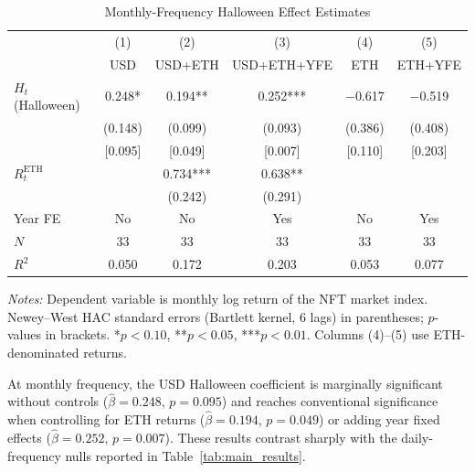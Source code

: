 \documentclass[12pt,a4paper]{article}
\begin{document}
\begin{table}[htbp]
\centering
\begin{threeparttable}
\caption{Monthly-Frequency Halloween Effect Estimates}
\label{tab:monthly}

\begin{tabular*}{\textwidth}{@{\extracolsep{\fill}} lccccc}
\toprule
& (1) & (2) & (3) & (4) & (5) \\
& USD & USD+ETH & USD+ETH+YFE & ETH & ETH+YFE \\
\midrule
$H_t$ (Halloween)  & 0.248*   & 0.194**  & 0.252*** & $-$0.617 & $-$0.519 \\
                   & (0.148)  & (0.099)  & (0.093)  & (0.386)  & (0.408) \\
                   & [0.095]  & [0.049]  & [0.007]  & [0.110]  & [0.203] \\
\addlinespace
$R_t^{\mathrm{ETH}}$ &  & 0.734*** & 0.638** &  & \\
                      &  & (0.242)  & (0.291) &  & \\
\addlinespace
Year FE            & No & No & Yes & No & Yes \\
$N$                & 33 & 33 & 33  & 33 & 33 \\
$R^2$              & 0.050 & 0.172 & 0.203 & 0.053 & 0.077 \\
\bottomrule
\end{tabular*}

\begin{tablenotes}[flushleft]
\footnotesize
\item \textit{Notes:} Dependent variable is monthly log return of the NFT market index. Newey--West HAC standard errors (Bartlett kernel, 6 lags) in parentheses; $p$-values in brackets. *$p < 0.10$, **$p < 0.05$, ***$p < 0.01$. Columns (4)--(5) use ETH-denominated returns.
\end{tablenotes}

\end{threeparttable}
\end{table}

At monthly frequency, the USD Halloween coefficient is marginally significant without controls ($\hat{\beta} = 0.248$, $p = 0.095$) and reaches conventional significance when controlling for ETH returns ($\hat{\beta} = 0.194$, $p = 0.049$) or adding year fixed effects ($\hat{\beta} = 0.252$, $p = 0.007$). These results contrast sharply with the daily-frequency nulls reported in Table~\ref{tab:main_results}.
\end{document}
